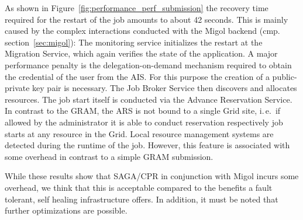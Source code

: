 \documentclass[times, 10pt,twocolumn]{article}
\begin{document}
As shown in Figure~\ref{fig:performance_perf_submission}  the recovery time required for the restart of the job amounts to 
about 42 seconds. This is mainly caused by the complex interactions conducted with the Migol backend (cmp. section~\ref{sec:migol}):
The monitoring service initializes the restart at the Migration Service, which again verifies the state of the application. A major performance
penalty is the delegation-on-demand mechanism required to obtain the credential of the user from the AIS. For this purpose the creation of a public-private key 
pair is necessary. The Job Broker Service then discovers and allocates resources. 
The job start itself is conducted via the Advance Reservation Service. In contrast to the GRAM, the ARS is not bound to a single Grid site, i.\,e.\ if allowed by the administrator it is able to conduct reservation respectively job starts at any resource in the Grid. Local resource management systems are detected during the runtime of the job. However, this feature is associated with some overhead in contrast to a simple GRAM submission. 

While these results show that SAGA/CPR in conjunction with Migol incurs some 
overhead, we think that this is acceptable compared to the benefits a fault tolerant, 
self healing infrastructure offers. In addition, it must be noted that further optimizations are possible.
\end{document}
